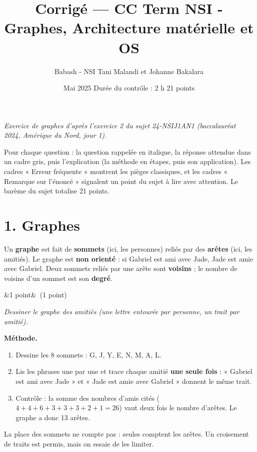 \documentclass[11pt, a4paper]{exam}
\title{Corrigé --- CC Term NSI - Graphes, Architecture matérielle et OS}
\author{Babash - NSI Tani Malandi et Johanne Bakalara}
\date{Mai 2025 \textperiodcentered{} Durée du contrôle : 2 h \textperiodcentered{} 21 points}
\newcommand{\Q}[3]{\par\needspace{5\baselineskip}\bigskip\noindent{\large\bfseries Question #1}\ifx&#2&\else\ \textnormal{(#2)}\fi\par\nopagebreak\smallskip\noindent\textit{#3}\par\nopagebreak\smallskip}
\newcommand{\methode}{\par\noindent\textbf{Méthode.}\ }
\newcommand{\sommetsAmis}{%
\node (G) at (0,0) {G}; \node (M) at (0,2.2) {M}; \node (N) at (2.6,2.2) {N};
\node (E) at (5.2,2.2) {E}; \node (A) at (5.2,4.4) {A}; \node (Y) at (7.8,4.4) {Y};
\node (J) at (7.8,2.2) {J}; \node (L) at (7.8,0) {L};}
\begin{document}
\pagestyle{foot}
\maketitle
\thispagestyle{foot}
\begin{center}\footnotesize\itshape Exercice de graphes d'après l'exercice 2 du sujet 24-NSIJ1AN1 (baccalauréat 2024, Amérique du Nord, jour 1).\end{center}

\begin{retenir}
Pour chaque question : la question rappelée en italique, la réponse attendue dans un cadre gris, puis l'explication (la méthode en étapes, puis son application). Les cadres « Erreur fréquente » montrent les pièges classiques, et les cadres « Remarque sur l'énoncé » signalent un point du sujet à lire avec attention. Le barème du sujet totalise 21 points.
\end{retenir}

\section*{1. Graphes}

\begin{retenir}
Un \textbf{graphe} est fait de \textbf{sommets} (ici, les personnes) reliés par des \textbf{arêtes} (ici, les amitiés). Le graphe est \textbf{non orienté} : si Gabriel est ami avec Jade, Jade est amie avec Gabriel. Deux sommets reliés par une arête sont \textbf{voisins} ; le nombre de voisins d'un sommet est son \textbf{degré}.
\end{retenir}

\Q{1}{1 point}{Dessiner le graphe des amitiés (une lettre entourée par personne, un trait par amitié).}
\begin{reponse}
\begin{center}
\end{center}
\end{reponse}
\methode
\begin{enumerate}
\item Dessine les 8 sommets : G, J, Y, E, N, M, A, L.
\item Lis les phrases une par une et trace chaque amitié \textbf{une seule fois} : « Gabriel est ami avec Jade » et « Jade est amie avec Gabriel » donnent le même trait.
\item Contrôle : la somme des nombres d'amis cités ($4 + 4 + 6 + 3 + 3 + 3 + 2 + 1 = 26$) vaut deux fois le nombre d'arêtes. Le graphe a donc 13 arêtes.
\end{enumerate}
La place des sommets ne compte pas : seules comptent les arêtes. Un croisement de traits est permis, mais on essaie de les limiter.
\end{document}

